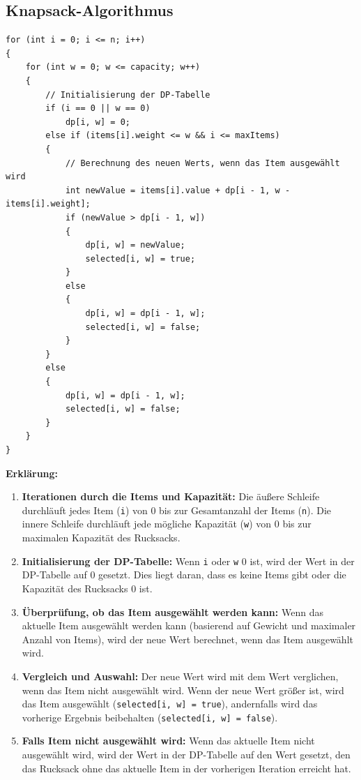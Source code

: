 \subsection*{Knapsack-Algorithmus}
\begin{lstlisting}[style=csharp, caption={}, label=code:dynamic]
for (int i = 0; i <= n; i++)
{
    for (int w = 0; w <= capacity; w++)
    {
        // Initialisierung der DP-Tabelle
        if (i == 0 || w == 0)
            dp[i, w] = 0;
        else if (items[i].weight <= w && i <= maxItems)
        {
            // Berechnung des neuen Werts, wenn das Item ausgewählt wird
            int newValue = items[i].value + dp[i - 1, w - items[i].weight];
            if (newValue > dp[i - 1, w])
            {
                dp[i, w] = newValue;
                selected[i, w] = true;
            }
            else
            {
                dp[i, w] = dp[i - 1, w];
                selected[i, w] = false;
            }
        }
        else
        {
            dp[i, w] = dp[i - 1, w];
            selected[i, w] = false;
        }
    }
}
\end{lstlisting}

\textbf{Erklärung:}
\begin{enumerate}
    \item \textbf{Iterationen durch die Items und Kapazität:} Die äußere Schleife durchläuft jedes Item (\texttt{i}) von 0 bis zur Gesamtanzahl der Items (\texttt{n}). Die innere Schleife durchläuft jede mögliche Kapazität (\texttt{w}) von 0 bis zur maximalen Kapazität des Rucksacks.

    \item \textbf{Initialisierung der DP-Tabelle:} Wenn \texttt{i} oder \texttt{w} 0 ist, wird der Wert in der DP-Tabelle auf 0 gesetzt. Dies liegt daran, dass es keine Items gibt oder die Kapazität des Rucksacks 0 ist.

    \item \textbf{Überprüfung, ob das Item ausgewählt werden kann:} Wenn das aktuelle Item ausgewählt werden kann (basierend auf Gewicht und maximaler Anzahl von Items), wird der neue Wert berechnet, wenn das Item ausgewählt wird.

    \item \textbf{Vergleich und Auswahl:} Der neue Wert wird mit dem Wert verglichen, wenn das Item nicht ausgewählt wird. Wenn der neue Wert größer ist, wird das Item ausgewählt (\texttt{selected[i, w] = true}), andernfalls wird das vorherige Ergebnis beibehalten (\texttt{selected[i, w] = false}).

    \item \textbf{Falls Item nicht ausgewählt wird:} Wenn das aktuelle Item nicht ausgewählt wird, wird der Wert in der DP-Tabelle auf den Wert gesetzt, den das Rucksack ohne das aktuelle Item in der vorherigen Iteration erreicht hat.\\
\end{enumerate}

